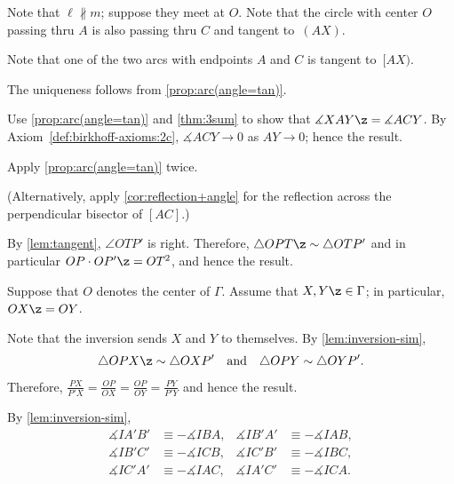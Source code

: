 Note that $\ell\nparallel m$;
suppose they meet at $O$.
Note that the circle with center $O$ passing thru $A$ is also passing thru $C$ and tangent to~$(AX)$.


Note that one of the two arcs with endpoints $A$ and $C$ is tangent to~$[AX)$.

The uniqueness follows from \ref{prop:arc(angle=tan)}.

 Use \ref{prop:arc(angle=tan)} and \ref{thm:3sum} to show that 
$\measuredangle XAY\z=\measuredangle ACY$.
By Axiom~\ref{def:birkhoff-axioms:2c}, $\measuredangle ACY\to 0$ as $AY\to 0$;
hence the result.

Apply \ref{prop:arc(angle=tan)} twice.

(Alternatively, apply \ref{cor:reflection+angle} for the reflection across the perpendicular bisector of $[AC]$.)



\setcounter{eqtn}{0}

By \ref{lem:tangent}, $\angle OTP'$ is right. 
Therefore, $\triangle OPT\z\sim \triangle OTP'$
and in particular
$OP\cdot OP'\z=OT^2$,
and hence the result.

Suppose that $O$ denotes the center of $\Gamma$.
Assume that $X,Y\z\in \Gamma$;
in particular, $OX\z=OY$.



Note that the inversion sends $X$ and $Y$ to themselves.
By \ref{lem:inversion-sim},
$$\triangle OPX\z\sim \triangle OXP'
\quad
\text{and}
\quad
\triangle OPY\sim \triangle OYP'.$$
Therefore, 
$\frac{PX}{P'X}=\frac{OP}{OX}=\frac{OP}{OY}=\frac{PY}{P'Y}$
and hence the result.

By \ref{lem:inversion-sim},
\begin{align*}
\measuredangle IA'B'&\equiv -\measuredangle IBA,
&
\measuredangle IB'A'&\equiv -\measuredangle IAB,
\\
\measuredangle IB'C'&\equiv -\measuredangle ICB,
&
\measuredangle IC'B'&\equiv -\measuredangle IBC,
\\
\measuredangle IC'A'&\equiv -\measuredangle IAC,
&
\measuredangle IA'C'&\equiv -\measuredangle ICA.
\end{align*}

